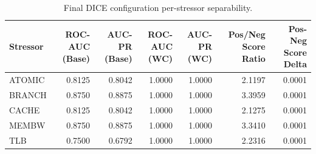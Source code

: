 \begin{table}[t]
\centering
\caption{Final DICE configuration per-stressor separability.}
\label{tab:dice_full_stressor}
\footnotesize
\begin{tabular}{lrrrrrr}
\toprule
Stressor & ROC-AUC (Base) & AUC-PR (Base) & ROC-AUC (WC) & AUC-PR (WC) & Pos/Neg Score Ratio & Pos-Neg Score Delta \\
\midrule
ATOMIC & 0.8125 & 0.8042 & 1.0000 & 1.0000 & 2.1197 & 0.0001 \\
BRANCH & 0.8750 & 0.8875 & 1.0000 & 1.0000 & 3.3959 & 0.0001 \\
CACHE & 0.8125 & 0.8042 & 1.0000 & 1.0000 & 2.1275 & 0.0001 \\
MEMBW & 0.8750 & 0.8875 & 1.0000 & 1.0000 & 3.3410 & 0.0001 \\
TLB & 0.7500 & 0.6792 & 1.0000 & 1.0000 & 2.2316 & 0.0001 \\
\bottomrule
\end{tabular}

\end{table}
